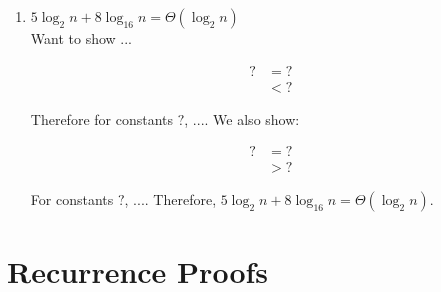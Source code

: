 \documentclass[11pt, letter]{article}
\begin{document}
\begin{enumerate}
    \item $5\log_2 n + 8\log_{16} n = \Theta(\log_2 n)$\\

    Want to show ...
    
    \begin{equation*}
        \begin{split}
            ? &= ?\\
            &< ?
        \end{split}
    \end{equation*}
    
    Therefore for constants $?$, $...$. We also show:
    
    \begin{equation*}
        \begin{split}
            ? &= ?\\
            &> ?
        \end{split}
    \end{equation*}
    
    For constants $?$, $...$. Therefore, $5\log_2 n + 8\log_{16} n = \Theta(\log_2 n)$.

\end{enumerate}

\section*{Recurrence Proofs}
\end{document}
